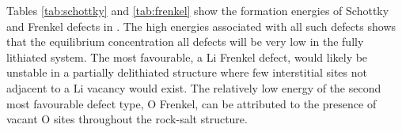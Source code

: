 \begin{table}[h]
\centering
\caption{Frenkel defect energies in }
\label{tab:frenkel}
\end{table}
\noindent
Tables \ref{tab:schottky} and \ref{tab:frenkel} show the formation energies of Schottky and Frenkel defects in .
The high energies associated with all such defects shows that the equilibrium concentration all defects will be very low in the fully lithiated system.
The most favourable, a Li Frenkel defect, would likely be unstable in a partially delithiated structure where few interstitial sites not adjacent to a Li vacancy would exist.
The relatively low energy of the second most favourable defect type, O Frenkel, can be attributed to the presence of vacant O sites throughout the rock-salt structure.

\newpage


\begin{table}[t]
\centering
\caption{Li vacancy migration energies in  in eV.}
\label{tab:migration}
\end{table}

